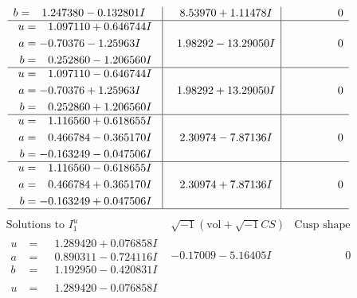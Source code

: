 \documentclass[1p]{elsarticle_modified}
\theoremstyle{definition}
\newcommand{\I}{\sqrt{-1}}
\begin{document}
$$\begin{array}{c|c|c}
\begin{aligned}
b &= \phantom{-}1.247380 - 0.132801 I\end{aligned}
 & \phantom{-}8.53970 + 1.11478 I & \phantom{-0.000000 } 0 \\ \hline\begin{aligned}
u &= \phantom{-}1.097110 + 0.646744 I \\
a &= -0.70376 - 1.25963 I \\
b &= \phantom{-}0.252860 - 1.206560 I\end{aligned}
 & \phantom{-}1.98292 - 13.29050 I & \phantom{-0.000000 } 0 \\ \hline\begin{aligned}
u &= \phantom{-}1.097110 - 0.646744 I \\
a &= -0.70376 + 1.25963 I \\
b &= \phantom{-}0.252860 + 1.206560 I\end{aligned}
 & \phantom{-}1.98292 + 13.29050 I & \phantom{-0.000000 } 0 \\ \hline\begin{aligned}
u &= \phantom{-}1.116560 + 0.618655 I \\
a &= \phantom{-}0.466784 - 0.365170 I \\
b &= -0.163249 - 0.047506 I\end{aligned}
 & \phantom{-}2.30974 - 7.87136 I & \phantom{-0.000000 } 0 \\ \hline\begin{aligned}
u &= \phantom{-}1.116560 - 0.618655 I \\
a &= \phantom{-}0.466784 + 0.365170 I \\
b &= -0.163249 + 0.047506 I\end{aligned}
 & \phantom{-}2.30974 + 7.87136 I & \phantom{-0.000000 } 0\\
 \hline 
 \end{array}$$\newpage$$\begin{array}{c|c|c}  
\text{Solutions to }I^u_{1}& \I (\text{vol} + \sqrt{-1}CS) & \text{Cusp shape}\\
 \hline 
\begin{aligned}
u &= \phantom{-}1.289420 + 0.076858 I \\
a &= \phantom{-}0.890311 - 0.724116 I \\
b &= \phantom{-}1.192950 - 0.420831 I\end{aligned}
 & -0.17009 - 5.16405 I & \phantom{-0.000000 } 0 \\ \hline\begin{aligned}
u &= \phantom{-}1.289420 - 0.076858 I \\

\end{aligned}
\end{array}$$
\end{document}
